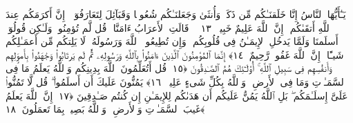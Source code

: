  يَـٰٓأَيُّهَا ٱلنَّاسُ إِنَّا خَلَقنَـٰكُم مِّن ذَكَرٍۢ وَأُنثَىٰ وَجَعَلنَـٰكُم شُعُوبًۭا وَقَبَآئِلَ لِتَعَارَفُوٓا۟ ۚ إِنَّ أَكرَمَكُم عِندَ ٱللَّهِ أَتقَىٰكُم ۚ إِنَّ ٱللَّهَ عَلِيمٌ خَبِيرٌۭ ﴿١٣﴾
 ۞ قَالَتِ ٱلأَعرَابُ ءَامَنَّا ۖ قُل لَّم تُؤمِنُوا۟ وَلَـٰكِن قُولُوٓا۟ أَسلَمنَا وَلَمَّا يَدخُلِ ٱلإِيمَـٰنُ فِى قُلُوبِكُم ۖ وَإِن تُطِيعُوا۟ ٱللَّهَ وَرَسُولَهُۥ لَا يَلِتكُم مِّن أَعمَـٰلِكُم شَيـًٔا ۚ إِنَّ ٱللَّهَ غَفُورٌۭ رَّحِيمٌ ﴿١٤﴾
 إِنَّمَا ٱلمُؤمِنُونَ ٱلَّذِينَ ءَامَنُوا۟ بِٱللَّهِ وَرَسُولِهِۦ ثُمَّ لَم يَرتَابُوا۟ وَجَٰهَدُوا۟ بِأَموَٟلِهِم وَأَنفُسِهِم فِى سَبِيلِ ٱللَّهِ ۚ أُو۟لَـٰٓئِكَ هُمُ ٱلصَّـٰدِقُونَ ﴿١٥﴾
 قُل أَتُعَلِّمُونَ ٱللَّهَ بِدِينِكُم وَٱللَّهُ يَعلَمُ مَا فِى ٱلسَّمَـٰوَٟتِ وَمَا فِى ٱلأَرضِ ۚ وَٱللَّهُ بِكُلِّ شَىءٍ عَلِيمٌۭ ﴿١٦﴾
 يَمُنُّونَ عَلَيكَ أَن أَسلَمُوا۟ ۖ قُل لَّا تَمُنُّوا۟ عَلَىَّ إِسلَـٰمَكُم ۖ بَلِ ٱللَّهُ يَمُنُّ عَلَيكُم أَن هَدَىٰكُم لِلإِيمَـٰنِ إِن كُنتُم صَـٰدِقِينَ ﴿١٧﴾
 إِنَّ ٱللَّهَ يَعلَمُ غَيبَ ٱلسَّمَـٰوَٟتِ وَٱلأَرضِ ۚ وَٱللَّهُ بَصِيرٌۢ بِمَا تَعمَلُونَ ﴿١٨﴾
 
